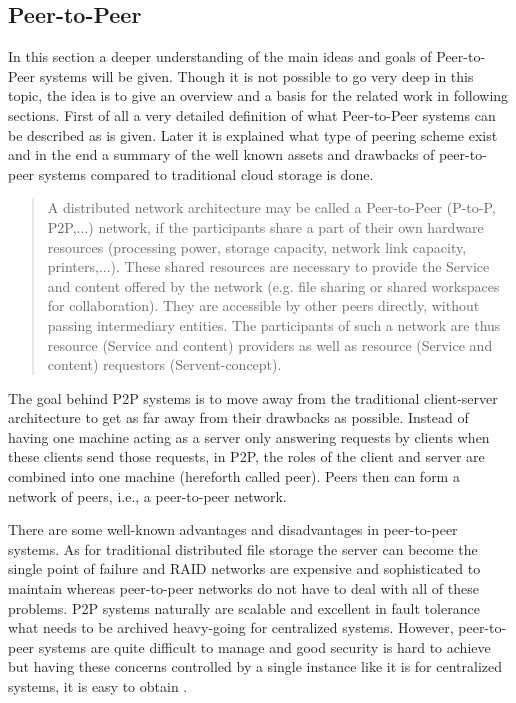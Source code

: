 \subsection{Peer-to-Peer}
In this section a deeper understanding of the main ideas and goals of Peer-to-Peer systems will be given. Though it is not possible to go very deep in this topic, the idea is to give an overview and a basis for the related work in following sections. First of all a very detailed definition of what Peer-to-Peer systems can be described as is given. Later it is explained what type of peering scheme exist and in the end a summary of the well known assets and drawbacks of peer-to-peer systems compared to traditional cloud storage is done.
\begin{quote}
A distributed network architecture may be called a Peer-to-Peer (P-to-P, P2P,...) network, if the participants share a part of their own hardware resources (processing power, storage capacity, network link capacity, printers,...). These shared resources are necessary to provide the Service and content offered by the network (e.g. file sharing or shared workspaces for collaboration). They are accessible by other peers directly, without passing intermediary entities. The participants of such a network are thus resource (Service and content) providers as well as resource (Service and content) requestors (Servent-concept)\cite{ptp:definition}.
\end{quote}
The goal behind P2P systems is to move away from the traditional client-server architecture to get as far away from their drawbacks as possible. Instead of having one machine acting as a server only answering requests by clients when these clients send those requests, in P2P, the roles of the client and server are combined into one machine (hereforth called peer). Peers then can form a network of peers, i.e., a peer-to-peer network.

There are some well-known advantages and disadvantages in peer-to-peer systems. As for traditional distributed file storage the server can become the single point of failure and RAID networks are expensive and sophisticated to maintain whereas peer-to-peer networks do not have to deal with all of these problems. P2P systems naturally are scalable and excellent in fault tolerance what needs to be archived heavy-going for centralized systems. However, peer-to-peer systems are quite difficult to manage and good security is hard to achieve but having these concerns controlled by a single instance like it is for centralized systems, it is easy to obtain \cite{tomp2p:p2p_introduction}.

